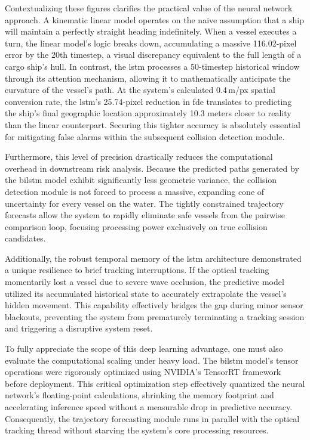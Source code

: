 Contextualizing these figures clarifies the practical value of the neural network approach. A kinematic linear model operates on the naive assumption that a ship will maintain a perfectly straight heading indefinitely. When a vessel executes a turn, the linear model's logic breaks down, accumulating a massive 116.02-pixel error by the 20th timestep, a visual discrepancy equivalent to the full length of a cargo ship's hull. In contrast, the \gls{lstm} processes a 50-timestep historical window through its attention mechanism, allowing it to mathematically anticipate the curvature of the vessel's path. At the system's calculated 0.4\,m/px spatial conversion rate, the \gls{lstm}'s 25.74-pixel reduction in \gls{fde} translates to predicting the ship's final geographic location approximately 10.3 meters closer to reality than the linear counterpart. Securing this tighter accuracy is absolutely essential for mitigating false alarms within the subsequent collision detection module.

Furthermore, this level of precision drastically reduces the computational overhead in downstream risk analysis. Because the predicted paths generated by the \gls{bilstm} model exhibit significantly less geometric variance, the collision detection module is not forced to process a massive, expanding cone of uncertainty for every vessel on the water. The tightly constrained trajectory forecasts allow the system to rapidly eliminate safe vessels from the pairwise comparison loop, focusing processing power exclusively on true collision candidates.

Additionally, the robust temporal memory of the \gls{lstm} architecture demonstrated a unique resilience to brief tracking interruptions. If the optical tracking momentarily lost a vessel due to severe wave occlusion, the predictive model utilized its accumulated historical state to accurately extrapolate the vessel's hidden movement. This capability effectively bridges the gap during minor sensor blackouts, preventing the system from prematurely terminating a tracking session and triggering a disruptive system reset.

To fully appreciate the scope of this deep learning advantage, one must also evaluate the computational scaling under heavy load. The \gls{bilstm} model's tensor operations were rigorously optimized using NVIDIA's TensorRT framework before deployment. This critical optimization step effectively quantized the neural network's floating-point calculations, shrinking the memory footprint and accelerating inference speed without a measurable drop in predictive accuracy. Consequently, the trajectory forecasting module runs in parallel with the optical tracking thread without starving the system's core processing resources.

